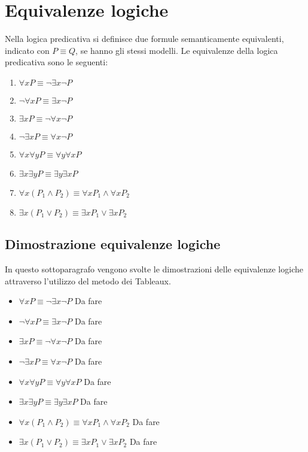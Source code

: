 \section{Equivalenze logiche}
Nella logica predicativa si definisce due formule semanticamente equivalenti,
indicato con $P \equiv Q$, se hanno gli stessi modelli.
Le equivalenze della logica predicativa sono le seguenti:
\begin{enumerate}
    \item $\forall x P \equiv \neg \exists x \neg P$
    \item $\neg \forall x P \equiv \exists x \neg P$
    \item $\exists x P \equiv \neg \forall x \neg P$
    \item $\neg \exists x P \equiv \forall x \neg P$
    \item $\forall x \forall y P \equiv \forall y \forall x P$
    \item $\exists x \exists y P \equiv \exists y \exists x P$
    \item $\forall x(P_1 \land P_2) \equiv \forall x P_1 \land \forall x P_2$
    \item $\exists x(P_1 \lor P_2) \equiv \exists x P_1 \lor \exists x P_2$
\end{enumerate}

\subsection{Dimostrazione equivalenze logiche}
In questo sottoparagrafo vengono svolte le dimostrazioni delle equivalenze logiche
attraverso l'utilizzo del metodo dei Tableaux.
\begin{itemize}
    \item $\forall x P \equiv \neg \exists x \neg P$
          Da fare
    \item $\neg \forall x P \equiv \exists x \neg P$
          Da fare
    \item $\exists x P \equiv \neg \forall x \neg P$
          Da fare
    \item $\neg \exists x P \equiv \forall x \neg P$
          Da fare
    \item $\forall x \forall y P \equiv \forall y \forall x P$
          Da fare
    \item $\exists x \exists y P \equiv \exists y \exists x P$
          Da fare
    \item $\forall x(P_1 \land P_2) \equiv \forall x P_1 \land \forall x P_2$
          Da fare
    \item $\exists x(P_1 \lor P_2) \equiv \exists x P_1 \lor \exists x P_2$
          Da fare
\end{itemize}
